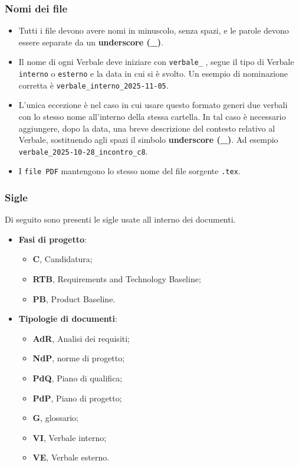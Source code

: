 \documentclass[a4paper,12pt]{article}
\begin{document}
\subsubsection*{Nomi dei file}
\begin{itemize}
    \item Tutti i file devono avere nomi in minuscolo, senza spazi, e le parole devono essere separate da un \textbf{underscore (\_)}.
    \item Il nome di ogni Verbale deve iniziare con \texttt{verbale\_} , segue il tipo di Verbale \texttt{interno} o \texttt{esterno} e la data in cui si è svolto. Un esempio di nominazione corretta è \texttt{verbale\_interno\_2025-11-05}.
    \item L'unica eccezione è nel caso in cui usare questo formato generi due verbali con lo stesso nome all'interno della stessa cartella. In tal caso è necessario aggiungere, dopo la data, una breve descrizione del contesto relativo al Verbale, sostituendo agli spazi il simbolo \textbf{underscore (\_)}. Ad esempio \texttt{verbale\_2025-10-28\_incontro\_c8}.
    \item I \texttt{file PDF} mantengono lo stesso nome del file sorgente \texttt{.tex}.
\end{itemize}

\subsubsection*{Sigle} \label{sigle}
Di seguito sono presenti le sigle usate all interno dei documenti.
\begin{itemize}
    \item \textbf{Fasi di progetto}:
    \begin{itemize}
        \item \textbf{C}, Candidatura;
        \item \textbf{RTB}, Requirements and Technology Baseline;
        \item \textbf{PB}, Product Baseline.
    \end{itemize}
    \item \textbf{Tipologie di documenti}:
    \begin{itemize}
        \item \textbf{AdR}, Analisi dei requisiti;
        \item \textbf{NdP}, norme di progetto;
        \item \textbf{PdQ}, Piano di qualifica;
        \item \textbf{PdP}, Piano di progetto;
        \item \textbf{G}, glossario;
        \item \textbf{VI}, Verbale interno;
        \item \textbf{VE}, Verbale esterno.
    \end{itemize}
\end{itemize}
\end{document}
